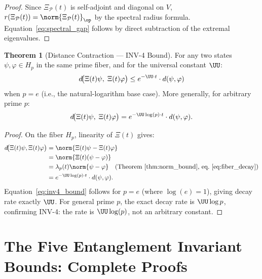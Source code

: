 \documentclass[12pt,letterpaper]{article}
\theoremstyle{definition}
\newtheorem{theorem}{Theorem}[section]
\theoremstyle{remark}
\begin{document}
\begin{proof}
Since $\Xi_\mathcal{P}(t)$ is self-adjoint and diagonal on $V$,
$r(\Xi_\mathcal{P}(t)) = \norm{\Xi_\mathcal{P}(t)}_\op$ by the spectral radius formula.
Equation~\eqref{eq:spectral_gap} follows by direct subtraction of the
extremal eigenvalues.
\end{proof}

\begin{theorem}[Distance Contraction --- INV-4 Bound]
\label{thm:distance_contraction}
For any two states $\psi, \varphi \in H_p$ in the same prime fiber, and
for the universal constant $\UU$:
\begin{equation}
  d\!\bigl(\Xi(t)\psi,\; \Xi(t)\varphi\bigr)
  \leq e^{-\UU\cdot t} \cdot d(\psi,\varphi)
  \label{eq:inv4_bound}
\end{equation}
when $p = e$ (i.e., the natural-logarithm base case). More generally,
for arbitrary prime $p$:
\begin{equation}
  d\!\bigl(\Xi(t)\psi,\; \Xi(t)\varphi\bigr)
  = e^{-\UU\log(p)\cdot t} \cdot d(\psi,\varphi).
  \label{eq:inv4_general}
\end{equation}
\end{theorem}

\begin{proof}
On the fiber $H_p$, linearity of $\Xi(t)$ gives:
\begin{align*}
  d\!\bigl(\Xi(t)\psi, \Xi(t)\varphi\bigr)
  &= \norm{\Xi(t)\psi - \Xi(t)\varphi} \\
  &= \norm{\Xi(t)(\psi - \varphi)} \\
  &= \lambda_p(t)\norm{\psi - \varphi}
     \quad\text{(Theorem~\ref{thm:norm_bound}, eq.~\eqref{eq:fiber_decay})}\\
  &= e^{-\UU\log(p)\cdot t}\cdot d(\psi,\varphi).
\end{align*}
Equation~\eqref{eq:inv4_bound} follows for $p = e$ (where $\log(e) = 1$),
giving decay rate exactly $\UU$. For general prime $p$, the exact
decay rate is $\UU\log p$, confirming INV-4: the rate is
$\UU\log(p)$, not an arbitrary constant.
\end{proof}
\newpage
\section{The Five Entanglement Invariant Bounds: Complete Proofs}
\label{sec:invariant_proofs}
\end{document}
